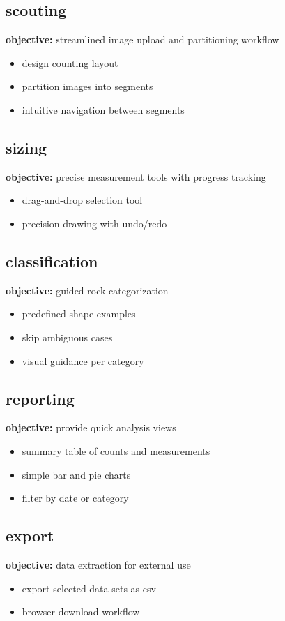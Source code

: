 \documentclass{article}
\begin{document}
\subsection{scouting}
\textbf{objective:} streamlined image upload and partitioning workflow
\begin{itemize}
\item design counting layout
\item partition images into segments
\item intuitive navigation between segments
\end{itemize}

\subsection{sizing}
\textbf{objective:} precise measurement tools with progress tracking
\begin{itemize}
\item drag-and-drop selection tool
\item precision drawing with undo/redo
\end{itemize}

\subsection{classification}
\textbf{objective:} guided rock categorization
\begin{itemize}
\item predefined shape examples
\item skip ambiguous cases
\item visual guidance per category
\end{itemize}

\subsection{reporting}
\textbf{objective:} provide quick analysis views
\begin{itemize}
\item summary table of counts and measurements
\item simple bar and pie charts
\item filter by date or category
\end{itemize}

\subsection{export}
\textbf{objective:} data extraction for external use
\begin{itemize}
\item export selected data sets as csv
\item browser download workflow
\end{itemize}
\end{document}
